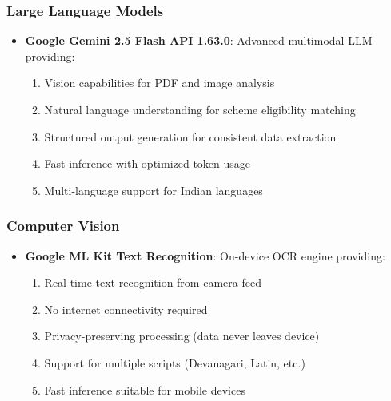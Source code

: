 \subsubsection{Large Language Models}
\begin{itemize}
    \item \textbf{Google Gemini 2.5 Flash API 1.63.0}: Advanced multimodal LLM providing:
    \begin{enumerate}
        \item Vision capabilities for PDF and image analysis
        \item Natural language understanding for scheme eligibility matching
        \item Structured output generation for consistent data extraction
        \item Fast inference with optimized token usage
        \item Multi-language support for Indian languages
    \end{enumerate}
\end{itemize}

\subsubsection{Computer Vision}
\begin{itemize}
    \item \textbf{Google ML Kit Text Recognition}: On-device OCR engine providing:
    \begin{enumerate}
        \item Real-time text recognition from camera feed
        \item No internet connectivity required
        \item Privacy-preserving processing (data never leaves device)
        \item Support for multiple scripts (Devanagari, Latin, etc.)
        \item Fast inference suitable for mobile devices
    \end{enumerate}
\end{itemize}

